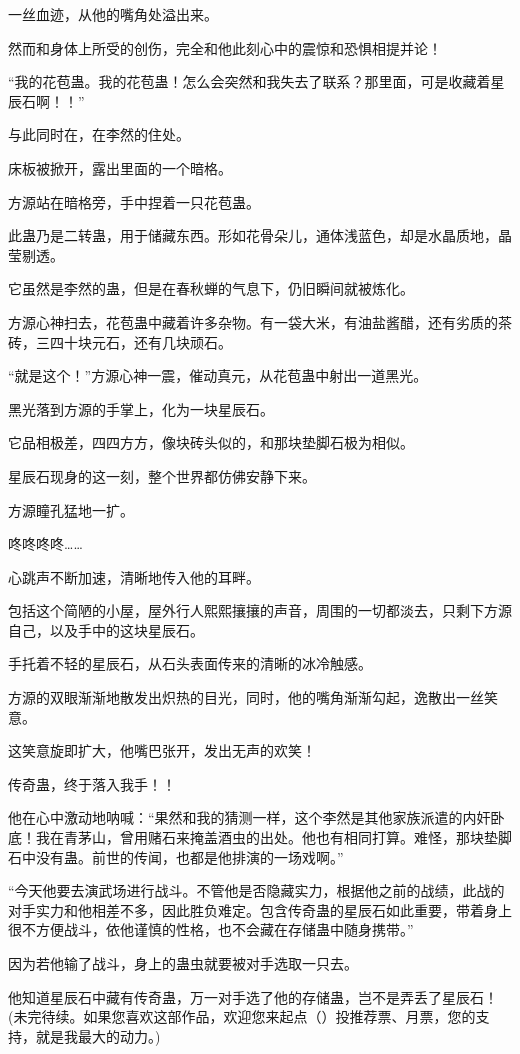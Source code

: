 \begin{this_body}
一丝血迹，从他的嘴角处溢出来。

然而和身体上所受的创伤，完全和他此刻心中的震惊和恐惧相提并论！

“我的花苞蛊。我的花苞蛊！怎么会突然和我失去了联系？那里面，可是收藏着星辰石啊！！”

与此同时在，在李然的住处。

床板被掀开，露出里面的一个暗格。

方源站在暗格旁，手中捏着一只花苞蛊。

此蛊乃是二转蛊，用于储藏东西。形如花骨朵儿，通体浅蓝色，却是水晶质地，晶莹剔透。

它虽然是李然的蛊，但是在春秋蝉的气息下，仍旧瞬间就被炼化。

方源心神扫去，花苞蛊中藏着许多杂物。有一袋大米，有油盐酱醋，还有劣质的茶砖，三四十块元石，还有几块顽石。

“就是这个！”方源心神一震，催动真元，从花苞蛊中射出一道黑光。

黑光落到方源的手掌上，化为一块星辰石。

它品相极差，四四方方，像块砖头似的，和那块垫脚石极为相似。

星辰石现身的这一刻，整个世界都仿佛安静下来。

方源瞳孔猛地一扩。

咚咚咚咚……

心跳声不断加速，清晰地传入他的耳畔。

包括这个简陋的小屋，屋外行人熙熙攘攘的声音，周围的一切都淡去，只剩下方源自己，以及手中的这块星辰石。

手托着不轻的星辰石，从石头表面传来的清晰的冰冷触感。

方源的双眼渐渐地散发出炽热的目光，同时，他的嘴角渐渐勾起，逸散出一丝笑意。

这笑意旋即扩大，他嘴巴张开，发出无声的欢笑！

传奇蛊，终于落入我手！！

他在心中激动地呐喊：“果然和我的猜测一样，这个李然是其他家族派遣的内奸卧底！我在青茅山，曾用赌石来掩盖酒虫的出处。他也有相同打算。难怪，那块垫脚石中没有蛊。前世的传闻，也都是他排演的一场戏啊。”

“今天他要去演武场进行战斗。不管他是否隐藏实力，根据他之前的战绩，此战的对手实力和他相差不多，因此胜负难定。包含传奇蛊的星辰石如此重要，带着身上很不方便战斗，依他谨慎的性格，也不会藏在存储蛊中随身携带。”

因为若他输了战斗，身上的蛊虫就要被对手选取一只去。

他知道星辰石中藏有传奇蛊，万一对手选了他的存储蛊，岂不是弄丢了星辰石！(未完待续。如果您喜欢这部作品，欢迎您来起点（）投推荐票、月票，您的支持，就是我最大的动力。)

\end{this_body}

